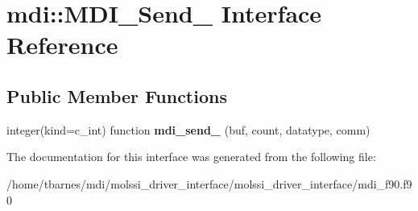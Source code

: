 \hypertarget{interfacemdi_1_1MDI__Send__}{\section{mdi\-:\-:M\-D\-I\-\_\-\-Send\-\_\- Interface Reference}
\label{interfacemdi_1_1MDI__Send__}
}
\subsection*{Public Member Functions}
\begin{DoxyCompactItemize}
\item 
\hypertarget{interfacemdi_1_1MDI__Send___a56b7aefaad39a2e38c76f253fdf76a6b}{integer(kind=c\-\_\-int) function {\bfseries mdi\-\_\-send\-\_\-} (buf, count, datatype, comm)}\label{interfacemdi_1_1MDI__Send___a56b7aefaad39a2e38c76f253fdf76a6b}

\end{DoxyCompactItemize}


The documentation for this interface was generated from the following file\-:\begin{DoxyCompactItemize}
\item 
/home/tbarnes/mdi/molssi\-\_\-driver\-\_\-interface/molssi\-\_\-driver\-\_\-interface/mdi\-\_\-f90.\-f90\end{DoxyCompactItemize}
